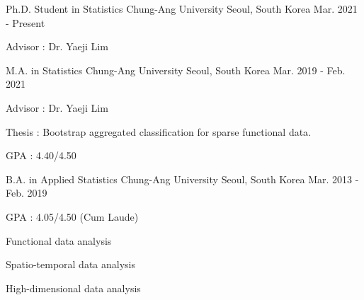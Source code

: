 \documentclass[11pt, a4paper]{awesome-cv} %
\begin{document}
\makecvheader %



\begin{cventries}
	\cventry
	{Ph.D. Student in Statistics} %
	{Chung-Ang University} %
	{Seoul, South Korea} %
	{Mar. 2021 - Present} %
	{ %
		\begin{cvitems}
			\item {Advisor : Dr. Yaeji Lim}
		\end{cvitems}
	}

	\cventry
	{M.A. in Statistics} %
	{Chung-Ang University} %
	{Seoul, South Korea} %
	{Mar. 2019 - Feb. 2021} %
	{ %
		\begin{cvitems}
			\item {Advisor : Dr. Yaeji Lim}
			\item {Thesis : Bootstrap aggregated classification for sparse functional data.}
			\item {GPA : 4.40/4.50}
		\end{cvitems}
	}
	
	\cventry
	{B.A. in Applied Statistics} %
	{Chung-Ang University} %
	{Seoul, South Korea} %
	{Mar. 2013 - Feb. 2019} %
	{ %
		\begin{cvitems}
			\item {GPA : 4.05/4.50 (Cum Laude)}
		\end{cvitems}
	}
\end{cventries}



\begin{cventries}
	\begin{cvitems}
		\begin{spacing}{1.2}
			\item {Functional data analysis}
			\item {Spatio-temporal data analysis}
			\item {High-dimensional data analysis}
		\end{spacing}
	\end{cvitems}
	\vspace{0.5cm}
\end{cventries}
\end{document}
